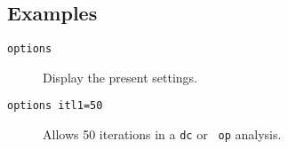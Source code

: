 \subsection{Examples}

\begin{description}

\item[{\tt options}] Display the present settings.

\item[{\tt options  itl1=50}] Allows 50 iterations in a {\tt dc} or {\tt
op} analysis.

\end{description}
